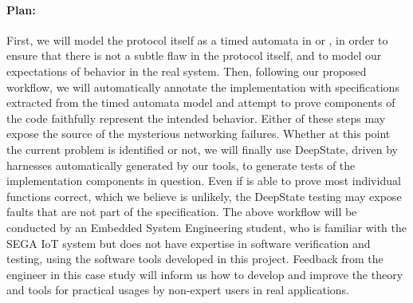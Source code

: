 \paragraph{Plan:}

First, we will model the protocol itself as a timed automata in \uppaal or \prism, in order to ensure that there is not a subtle flaw in the protocol itself, and to model our expectations of behavior in the real system.
Then, following our proposed workflow, we will automatically annotate the implementation with specifications extracted from %
the timed automata model and attempt to prove components of the code faithfully represent the intended behavior.
Either of these steps may expose the source of the mysterious networking failures.
Whether at this point the current problem is identified or not, we will finally use DeepState, driven by harnesses automatically generated by our tools, to generate tests of the implementation components in question.
Even if %
\framac is able to prove most individual functions correct, which we believe is unlikely, the DeepState testing may expose faults that are not part of the specification.
%
%
The above workflow will be conducted by an Embedded System Engineering student, who is familiar with the SEGA IoT system but does not have expertise in software verification and testing, using the software tools developed in this project.
Feedback from the engineer in this case study will inform us how to develop and improve the theory and tools for practical usages by non-expert users in real applications.


